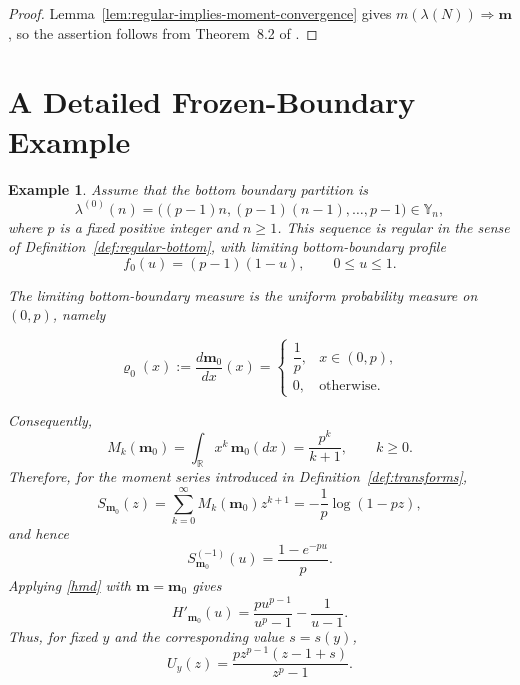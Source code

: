 \documentclass[11pt]{amsart}
\theoremstyle{plain}
\newtheorem{example}[theorem]{Example}
\newcommand\YY{{\mathbb {Y}}}
\newcommand\bm{\mathbf{m}}
\numberwithin{equation}{section}
\numberwithin{theorem}{section}
\numberwithin{figure}{section}
\begin{document}
\begin{proof}
Lemma~\ref{lem:regular-implies-moment-convergence} gives
$m(\lambda(N))\Longrightarrow\bm$, so the assertion follows from
Theorem~8.2 of \cite{bg16}.
\end{proof}



\section{A Detailed Frozen-Boundary Example}
\label{app:linear-bottom-boundary}

\begin{example}\label{ex:linear-bottom-boundary}
Assume that the bottom boundary partition is
\[
    \lambda^{(0)}(n)
    =
    \bigl((p-1)n,(p-1)(n-1),\ldots,p-1\bigr)
    \in\YY_n,
\]
where $p$ is a fixed positive integer and $n\geq1$. This sequence is regular in
the sense of Definition~\ref{def:regular-bottom}, with limiting
bottom-boundary profile
\[
    f_0(u)=(p-1)(1-u),
    \qquad 0\leq u\leq1.
\]

The limiting bottom-boundary
measure is the uniform probability measure on $(0,p)$, namely

\[
     \varrho_0(x)
    :=
    \frac{d\mathbf m_0}{dx}(x)
    =
    \begin{cases}
        \dfrac1p, & x\in(0,p),\\[1mm]
        0, & \text{otherwise}.
    \end{cases}
\]

Consequently,
\[
    M_k(\mathbf m_0)
    =
    \int_{\mathbb R}x^k\,\mathbf m_0(dx)
    =
    \frac{p^k}{k+1},
    \qquad k\geq0.
\]
Therefore, for the moment series introduced in
Definition~\ref{def:transforms},
\[
    S_{\mathbf m_0}(z)
    =
    \sum_{k=0}^{\infty}M_k(\mathbf m_0)z^{k+1}
    =
    -\frac1p\log(1-pz),
\]
and hence
\[
    S_{\mathbf m_0}^{(-1)}(u)
    =
    \frac{1-e^{-pu}}{p}.
\]
Applying \eqref{hmd} with $\mathbf m=\mathbf m_0$ gives
\[
    H'_{\mathbf m_0}(u)
    =
    \frac{pu^{p-1}}{u^p-1}
    -
    \frac1{u-1}.
\]
Thus, for fixed $y$ and the corresponding value $s=s(y)$,
\[
    U_y(z)
    =
    \frac{pz^{p-1}(z-1+s)}{z^p-1}.
\]


\end{example}
\end{document}
